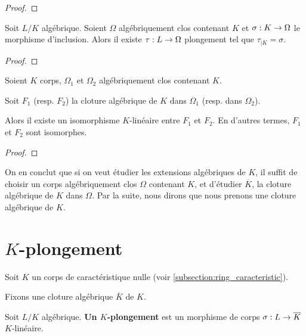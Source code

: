 \ifdefined\outputproof
\begin{proof}

\end{proof}
\fi

\begin{theorem} 
	Soit $L/K$ algébrique.
	Soient $\Omega$ algébriquement clos contenant $K$ et $\sigma : K \rightarrow \Omega$ le
	morphisme d'inclusion.
	Alors il existe $\tau : L \rightarrow \Omega$ plongement tel que $\tau_{|K}
	= \sigma$.
\end{theorem}

\ifdefined\outputproof
\begin{proof}

\end{proof}
\fi

\begin{corollary}
	Soient $K$ corps, $\Omega_{1}$ et $\Omega_{2}$ algébriquement clos contenant
	$K$.

	Soit $F_{1}$ (resp. $F_{2}$) la cloture algébrique de $K$ dans $\Omega_{1}$
	(resp. dans $\Omega_{2}$).

	Alors il existe un isomorphisme $K$-linéaire entre $F_{1}$ et
	$F_{2}$. En d'autres termes, $F_{1}$ et $F_{2}$ sont isomorphes.
\end{corollary}

\ifdefined\outputproof
\begin{proof}

\end{proof}
\fi

On en conclut que si on veut étudier les extensions algébriques de $K$, il
suffit de choisir un corps algébriquement clos $\Omega$ contenant $K$, et
d'étudier $\overline{K}$, la cloture algébrique de $K$ dans $\Omega$. Par la
suite, nous dirons que nous prenons une cloture algébrique de $K$.

\section{$K$-plongement}

Soit $K$ un corps de caractéristique nulle (voir
\ref{subsection:ring_caracteristic}).

Fixons une cloture algébrique $\overline{K}$ de $K$.

\begin{definition}
	Soit $L/K$ algébrique.
	\textbf{Un $K$-plongement} est un morphisme de corps
	$\sigma : L \rightarrow \overline{K}$ $K$-linéaire.
\end{definition}

